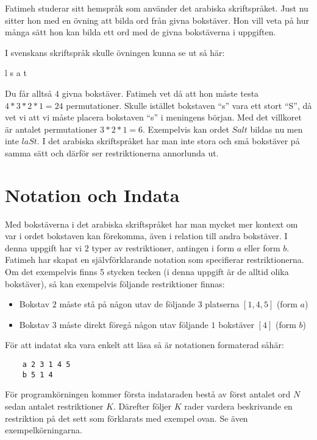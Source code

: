
Fatimeh studerar sitt hemspråk som använder det arabiska skriftspråket. Just nu
sitter hon med en övning att bilda ord från givna bokstäver. Hon vill veta på
hur många sätt hon kan bilda ett ord med de givna bokstäverna i uppgiften.

I svenskans skriftspråk skulle övningen kunna se ut så här:

\vspace{0.2in}
\centerline{l s a t}
\vspace{0.2in}

Du får alltså 4 givna bokstäver. Fatimeh vet då att hon måste testa $4*3*2*1 =
24$ permutationer. Skulle istället bokstaven ``s'' vara ett stort ``S'', då vet vi
att vi måste placera bokstaven ``s'' i meningens början. Med det villkoret är
antalet permutationer $3*2*1 = 6$.  Exempelvis kan ordet $Salt$ bildas nu men
inte $laSt$. I det arabiska skriftspråket har man inte stora och små bokstäver
på samma sätt och därför ser restriktionerna annorlunda ut.

\section*{Notation och Indata}

Med bokstäverna i det arabiska skriftspråket har man mycket mer kontext om var
i ordet bokstaven kan förekomma, även i relation till andra bokstäver.  I denna
uppgift har vi $2$ typer av restriktioner, antingen i form $a$ eller form $b$. Fatimeh har skapat en
självförklarande notation som specifierar restriktionerna. Om det exempelvis
finns 5 stycken tecken (i denna uppgift är de alltid olika bokstäver), så kan
exempelvis följande restriktioner finnas:

\begin{itemize}
    \item Bokstav $2$ måste stå på någon utav de följande $3$ platserna $[1, 4, 5]$ (form $a$)
    \item Bokstav $3$ måste direkt föregå någon utav följande $1$ bokstäver $[4]$ (form $b$)
\end{itemize}

För att indatat ska vara enkelt att läsa så är notationen formaterad såhär:

\begin{lstlisting}
    a 2 3 1 4 5
    b 5 1 4
\end{lstlisting}

För programkörningen kommer första indataraden bestå av först antalet ord $N$
sedan antalet restriktioner $K$. Därefter följer $K$ rader vardera beskrivande
en restriktion på det sett som förklarats med exempel ovan. Se även
exempelkörningarna.

